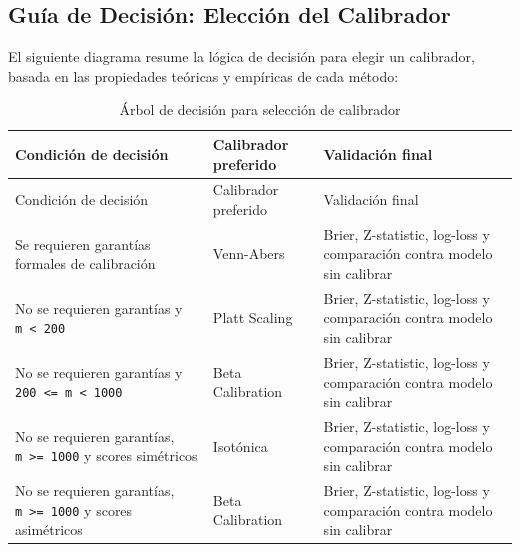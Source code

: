\documentclass[
  spanish,
  11pt,
  letterpaper,
]{scrbook}
\theoremstyle{plain}
\theoremstyle{remark}
\begin{document}
\subsection{Guía de Decisión: Elección del
Calibrador}\label{sec-calibration-decision}

El siguiente diagrama resume la lógica de decisión para elegir un
calibrador, basada en las propiedades teóricas y empíricas de cada
método:

\begin{longtable}[]{@{}
  >{\raggedright\arraybackslash}p{}
  >{\raggedright\arraybackslash}p{}
  >{\raggedright\arraybackslash}p{}@{}}
\caption{Árbol de decisión para selección de
calibrador}\label{tbl-calibration-decision}\tabularnewline
\toprule\noalign{}
\begin{minipage}[b]{\linewidth}\raggedright
Condición de decisión
\end{minipage} & \begin{minipage}[b]{\linewidth}\raggedright
Calibrador preferido
\end{minipage} & \begin{minipage}[b]{\linewidth}\raggedright
Validación final
\end{minipage} \\
\midrule\noalign{}
\endfirsthead
\toprule\noalign{}
\begin{minipage}[b]{\linewidth}\raggedright
Condición de decisión
\end{minipage} & \begin{minipage}[b]{\linewidth}\raggedright
Calibrador preferido
\end{minipage} & \begin{minipage}[b]{\linewidth}\raggedright
Validación final
\end{minipage} \\
\midrule\noalign{}
\endhead
\bottomrule\noalign{}
\endlastfoot
Se requieren garantías formales de calibración & Venn-Abers & Brier,
Z-statistic, log-loss y comparación contra modelo sin calibrar \\
No se requieren garantías y \texttt{m\ \textless{}\ 200} & Platt Scaling
& Brier, Z-statistic, log-loss y comparación contra modelo sin
calibrar \\
No se requieren garantías y
\texttt{200\ \textless{}=\ m\ \textless{}\ 1000} & Beta Calibration &
Brier, Z-statistic, log-loss y comparación contra modelo sin calibrar \\
No se requieren garantías, \texttt{m\ \textgreater{}=\ 1000} y scores
simétricos & Isotónica & Brier, Z-statistic, log-loss y comparación
contra modelo sin calibrar \\
No se requieren garantías, \texttt{m\ \textgreater{}=\ 1000} y scores
asimétricos & Beta Calibration & Brier, Z-statistic, log-loss y
comparación contra modelo sin calibrar \\
\end{longtable}
\end{document}
